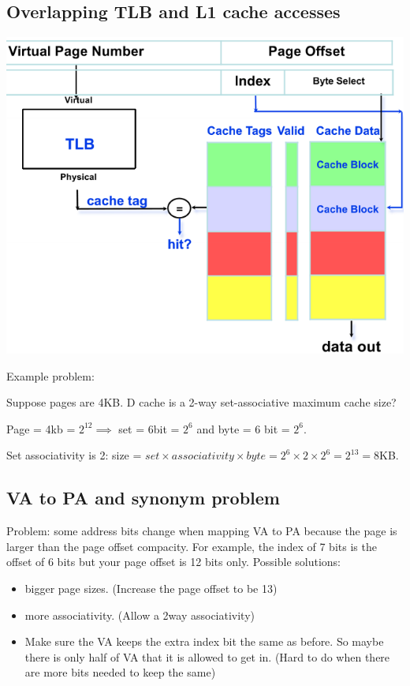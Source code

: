 \documentclass[letterpaper,12pt]{article}
\begin{document}
\subsection{Overlapping TLB and L1 cache accesses}

\includegraphics*[scale = 0.7]{./Image/Overlapping TLB and L1 cache accesses.png}

Example problem:

Suppose pages are 4KB. D cache is a 2-way set-associative maximum cache size?

Page = 4kb = $2^{12}\implies$ set = 6bit = $2^6$ and byte = 6 bit = $2^6$.

Set associativity is 2: size = $set\times associativity \times byte=2^6\times 2\times 2^6=2^{13}=8$KB.

\subsection{VA to PA and synonym problem}

Problem: some address bits change when mapping VA to PA because the page is larger than the page offset compacity. For example, the index of 7 bits is the offset of 6 bits but your page offset is 12 bits only.
Possible solutions:
\begin{itemize}
    \item bigger page sizes. (Increase the page offset to be 13)
    \item more associativity. (Allow a 2\-way associativity)
    \item Make sure the VA keeps the extra index bit the same as before. So maybe there is only half of VA that it is allowed to get in. (Hard to do when there are more bits needed to keep the same)
\end{itemize}
\end{document}
